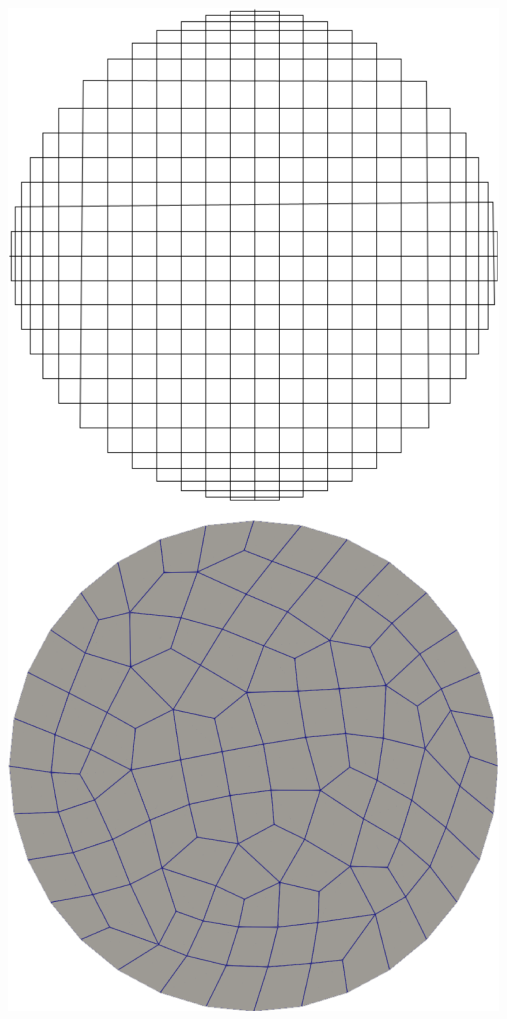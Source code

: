 \documentclass[compress,10pt,aspectratio=169]{beamer}
\begin{document}
\begin{frame}
\begin{columns}
\begin{column}{0.32\textwidth}
{    \includegraphics[scale=0.35]{images/align_bord.pdf}
\vspace{0.2cm}
}
\end{column}
\end{columns}
\end{frame}
\end{document}
